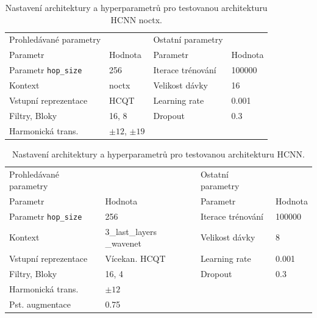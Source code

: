 \begin{table}[p]
\centering
\begin{tabular}{llll}
\toprule
Prohledávané parametry               &          & Ostatní parametry &         \\
Parametr                             & Hodnota  & Parametr          & Hodnota \\
\midrule
Parametr \texttt{hop\_size} & 256       & Iterace trénování                       & 100000 \\
Kontext                & noctx         & Velikost dávky                      & 16     \\
Vstupní reprezentace   & HCQT       & Learning rate                   & 0.001  \\
Filtry, Bloky                 & 16, 8        & Dropout                          & 0.3    \\
Harmonická trans. & $\pm 12$, $\pm 19$ &  &       \\
\bottomrule
\end{tabular}
\caption{Nastavení architektury a hyperparametrů pro testovanou architekturu HCNN noctx.}\label{tab:hcnnnoctx_hyperparams}
\end{table}
\begin{table}[p]
\centering
\begin{tabular}{p{4.5cm}p{3cm}ll}
\toprule
Prohledávané parametry               &          & Ostatní parametry &         \\
Parametr                             & Hodnota  & Parametr          & Hodnota \\
\midrule
Parametr \texttt{hop\_size} & 256     & Iterace trénování                       & 100000 \\
Kontext            & 3\_last\_layers \_wavenet & Velikost dávky                      & 8      \\
Vstupní reprezentace    & Vícekan. HCQT & Learning rate                   & 0.001  \\
Filtry, Bloky & 16, 4      & Dropout                          & 0.3    \\
Harmonická trans. & $\pm 12$&   &       \\
Pst. augmentace       & 0.75    &                                  &        \\
\bottomrule
\end{tabular}
\caption{Nastavení architektury a hyperparametrů pro testovanou architekturu HCNN.}\label{tab:hcnn_hyperparams}
\end{table}

